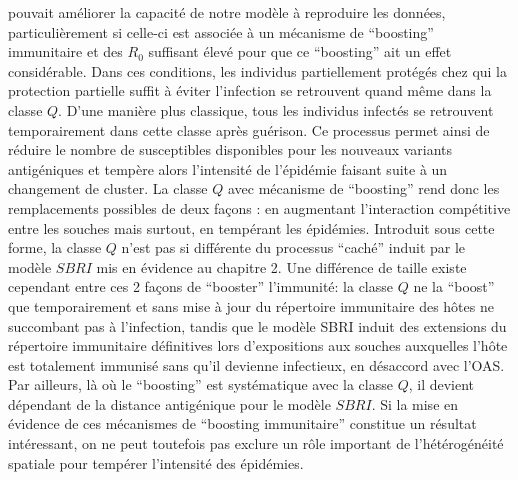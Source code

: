 pouvait améliorer la capacité de notre modèle à reproduire les
données, particulièrement si celle-ci est associée à un mécanisme de
``boosting'' immunitaire et des $R_0$ suffisant élevé pour que ce
``boosting'' ait un effet considérable. Dans ces conditions, les
individus partiellement protégés chez qui la protection partielle
suffit à éviter l'infection se retrouvent quand même dans la classe
$Q$. D'une manière plus classique, tous les individus infectés se
retrouvent temporairement dans cette classe après guérison. Ce
processus permet ainsi de réduire le nombre de susceptibles
disponibles pour les nouveaux variants antigéniques et tempère alors
l'intensité de l'épidémie faisant suite à un changement de cluster. La
classe $Q$ avec mécanisme de ``boosting'' rend donc les remplacements
possibles de deux façons : en augmentant l'interaction compétitive
entre les souches mais surtout, en tempérant les épidémies. Introduit
sous cette forme, la classe $Q$ n'est pas si différente du processus
``caché'' induit par le modèle $SBRI$ mis en évidence au chapitre 2.
Une différence de taille existe cependant entre ces 2 façons de
``booster'' l'immunité: la classe $Q$ ne la ``boost'' que
temporairement et sans mise à jour du répertoire immunitaire des hôtes
ne succombant pas à l'infection, tandis que le modèle SBRI induit des
extensions du répertoire immunitaire définitives lors d'expositions
aux souches auxquelles l'hôte est totalement immunisé sans qu'il
devienne infectieux, en désaccord avec l'OAS. Par ailleurs, là où le
``boosting'' est systématique avec la classe $Q$, il devient dépendant
de la distance antigénique pour le modèle $SBRI$. Si la mise en
évidence de ces mécanismes de ``boosting immunitaire'' constitue un
résultat intéressant, on ne peut toutefois pas exclure un rôle
important de l'hétérogénéité spatiale pour tempérer l'intensité des
épidémies.








